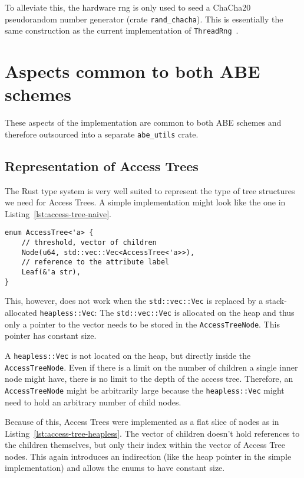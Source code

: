 To alleviate this, the hardware \acrshort{rng} is only used to seed a ChaCha20 pseudorandom number generator (crate \texttt{rand\_chacha}).
This is essentially the same construction as the current implementation of \texttt{ThreadRng}~\cite{noauthor_rust_nodate}.

\section{Aspects common to both ABE schemes}

These aspects of the implementation are common to both ABE schemes and therefore outsourced into a separate \verb+abe_utils+ crate.

\subsection{Representation of Access Trees}
The Rust type system is very well suited to represent the type of tree structures we need for Access Trees.
A simple implementation might look like the one in Listing~\ref{lst:access-tree-naive}. 

\begin{lstlisting}[caption={Simple Implementation of Access Trees (using the standard library)},label={lst:access-tree-naive}]
enum AccessTree<'a> {
    // threshold, vector of children
    Node(u64, std::vec::Vec<AccessTree<'a>>),
    // reference to the attribute label
    Leaf(&'a str),
}
\end{lstlisting}

This, however, does not work when the \texttt{std::vec::Vec} is replaced by a stack-allocated \texttt{heapless::Vec}:
The \texttt{std::vec::Vec} is allocated on the heap and thus only a pointer to the vector needs to be stored in the \texttt{AccessTreeNode}.
This pointer has constant size.

A \texttt{heapless::Vec} is not located on the heap, but directly inside the \texttt{AccessTreeNode}.
Even if there is a limit on the number of children a single inner node might have, there is no limit to the depth of the access tree.
Therefore, an \texttt{AccessTreeNode} might be arbitrarily large because the \texttt{heapless::Vec} might need to hold an arbitrary number of child nodes.

Because of this, Access Trees were implemented as a flat slice of nodes as in Listing~\ref{lst:access-tree-heapless}. 
The vector of children doesn't hold references to the children themselves, but only their index within the vector of Access Tree nodes.
This again introduces an indirection (like the heap pointer in the simple implementation) and allows the enums to have constant size.

